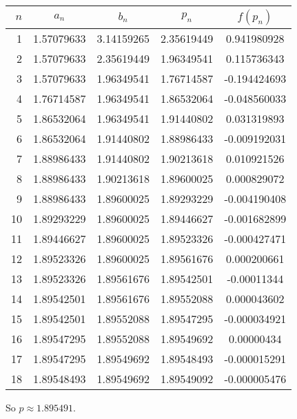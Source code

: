 \documentclass[../../Assignments.tex]{subfiles}
\begin{document}
\begin{solution}
\begin{enumerate}[label=(\alph*)]
            \begin{longtable}{r S[table-format=1.8] S[table-format=1.8] S[table-format=1.8] S[table-format=-1.9]}
                \toprule
                \(n\)  &   {\(a_n\)}   &   {\(b_n\)}   &   {\(p_n\)}   &  {\(f(p_n)\)}  \\
                  &  1.57079633   &  3.14159265   &  2.35619449   &   0.941980928  \\
                    2  &  1.57079633   &  2.35619449   &  1.96349541   &   0.115736343  \\
                    3  &  1.57079633   &  1.96349541   &  1.76714587   &  -0.194424693  \\
                    4  &  1.76714587   &  1.96349541   &  1.86532064   &  -0.048560033  \\
                    5  &  1.86532064   &  1.96349541   &  1.91440802   &   0.031319893  \\
                    6  &  1.86532064   &  1.91440802   &  1.88986433   &  -0.009192031  \\
                    7  &  1.88986433   &  1.91440802   &  1.90213618   &   0.010921526  \\
                    8  &  1.88986433   &  1.90213618   &  1.89600025   &   0.000829072  \\
                    9  &  1.88986433   &  1.89600025   &  1.89293229   &  -0.004190408  \\
                   10  &  1.89293229   &  1.89600025   &  1.89446627   &  -0.001682899  \\
                   11  &  1.89446627   &  1.89600025   &  1.89523326   &  -0.000427471  \\
                   12  &  1.89523326   &  1.89600025   &  1.89561676   &   0.000200661  \\
                   13  &  1.89523326   &  1.89561676   &  1.89542501   &  -0.00011344   \\
                   14  &  1.89542501   &  1.89561676   &  1.89552088   &   0.000043602  \\
                   15  &  1.89542501   &  1.89552088   &  1.89547295   &  -0.000034921  \\
                   16  &  1.89547295   &  1.89552088   &  1.89549692   &   0.00000434   \\
                   17  &  1.89547295   &  1.89549692   &  1.89548493   &  -0.000015291  \\
                   18  &  1.89548493   &  1.89549692   &  1.89549092   &  -0.000005476  \\
                \bottomrule
            \end{longtable}

            So \(p \approx \num{1.895491}\).

    \end{enumerate}
\end{solution}
\end{document}
